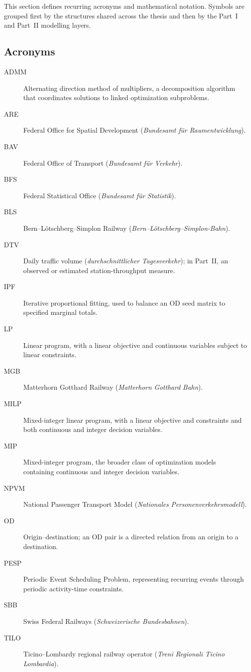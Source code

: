 \documentclass[preprint,12pt]{elsarticle}
\begin{document}
This section defines recurring acronyms and mathematical notation. Symbols are grouped first by the structures shared across the thesis and then by the Part~I and Part~II modelling layers.

\subsection*{Acronyms}
\begin{description}
    \item[ADMM] Alternating direction method of multipliers, a decomposition algorithm that coordinates solutions to linked optimization subproblems.
    \item[ARE] Federal Office for Spatial Development (\textit{Bundesamt für Raumentwicklung}).
    \item[BAV] Federal Office of Transport (\textit{Bundesamt für Verkehr}).
    \item[BFS] Federal Statistical Office (\textit{Bundesamt für Statistik}).
    \item[BLS] Bern--Lötschberg--Simplon Railway (\textit{Bern--Lötschberg--Simplon-Bahn}).
    \item[DTV] Daily traffic volume (\textit{durchschnittlicher Tagesverkehr}); in Part~II, an observed or estimated station-throughput measure.
    \item[IPF] Iterative proportional fitting, used to balance an OD seed matrix to specified marginal totals.
    \item[LP] Linear program, with a linear objective and continuous variables subject to linear constraints.
    \item[MGB] Matterhorn Gotthard Railway (\textit{Matterhorn Gotthard Bahn}).
    \item[MILP] Mixed-integer linear program, with a linear objective and constraints and both continuous and integer decision variables.
    \item[MIP] Mixed-integer program, the broader class of optimization models containing continuous and integer decision variables.
    \item[NPVM] National Passenger Transport Model (\textit{Nationales Personenverkehrsmodell}).
    \item[OD] Origin--destination; an OD pair is a directed relation from an origin to a destination.
    \item[PESP] Periodic Event Scheduling Problem, representing recurring events through periodic activity-time constraints.
    \item[SBB] Swiss Federal Railways (\textit{Schweizerische Bundesbahnen}).
    \item[TILO] Ticino--Lombardy regional railway operator (\textit{Treni Regionali Ticino Lombardia}).
\end{description}
\newpage
\end{document}
